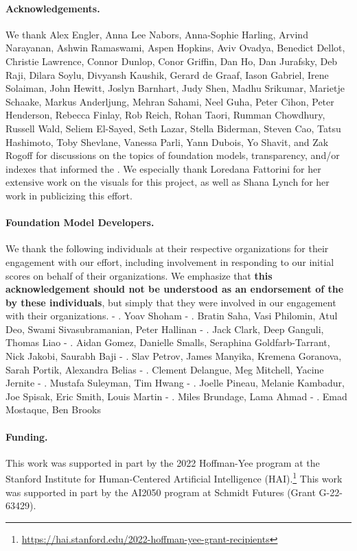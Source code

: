 \documentclass[screen, authorversion, acmsmall]{acmart}
\begin{document}
\paragraph{Acknowledgements.}
We thank Alex Engler, Anna Lee Nabors, Anna-Sophie Harling, Arvind Narayanan, Ashwin Ramaswami, Aspen Hopkins, Aviv Ovadya, Benedict Dellot, Christie Lawrence, Connor Dunlop, Conor Griffin, Dan Ho, Dan Jurafsky, Deb Raji, Dilara Soylu, Divyansh Kaushik, Gerard de Graaf, Iason Gabriel, Irene Solaiman, John Hewitt, Joslyn Barnhart, Judy Shen, Madhu Srikumar, Marietje Schaake, Markus Anderljung, Mehran Sahami, Neel Guha, Peter Cihon, Peter Henderson, Rebecca Finlay, Rob Reich, Rohan Taori, Rumman Chowdhury, Russell Wald, Seliem El-Sayed, Seth Lazar, Stella Biderman, Steven Cao, Tatsu Hashimoto, Toby Shevlane, Vanessa Parli, Yann Dubois, Yo Shavit, and Zak Rogoff for discussions on the topics of foundation models, transparency, and/or indexes that informed the \projectname. 
We especially thank Loredana Fattorini for her extensive work on the visuals for this project, as well as Shana Lynch for her work in publicizing this effort.

\paragraph{Foundation Model Developers.}
We thank the following individuals at their respective organizations for their engagement with our effort, including involvement in responding to our initial scores on behalf of their organizations. 
We emphasize that \textbf{this acknowledgement should not be understood as an endorsement of the \projectname by these individuals}, but simply that they were involved in our engagement with their organizations.
-  \aitwentyone. Yoav Shoham
-  \amazon. Bratin Saha, Vasi Philomin, Atul Deo, Swami Sivasubramanian, Peter Hallinan
-  \anthropic. Jack Clark, Deep Ganguli, Thomas Liao
-  \cohere. Aidan Gomez, Danielle Smalls, Seraphina Goldfarb-Tarrant, Nick Jakobi, Saurabh Baji
-  \google. Slav Petrov, James Manyika, Kremena Goranova, Sarah Portik, Alexandra Belias
-  \huggingface. Clement Delangue, Meg Mitchell, Yacine Jernite
-  \inflection. Mustafa Suleyman, Tim Hwang
-  \meta. Joelle Pineau, Melanie Kambadur, Joe Spisak, Eric Smith, Louis Martin
-  \openai. Miles Brundage, Lama Ahmad
-  \stability. Emad Mostaque, Ben Brooks

\paragraph{Funding.}
This work was supported in part by the 2022 Hoffman-Yee program at the Stanford Institute for Human-Centered Artificial Intelligence (HAI).\footnote{\url{https://hai.stanford.edu/2022-hoffman-yee-grant-recipients}}
This work was supported in part by the AI2050 program at Schmidt Futures (Grant G-22-63429).
\end{document}
